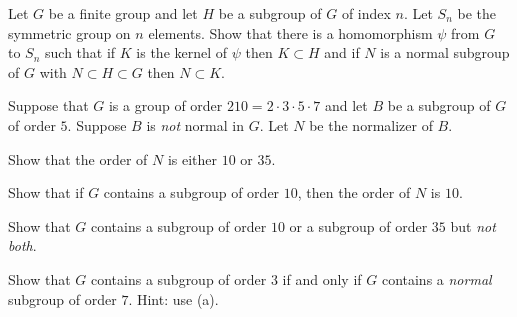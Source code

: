 \begin{alist}
\item Let $G$ be a finite group and let $H$ be a subgroup of $G$ of
index $n$. Let $S_n$ be the symmetric group on $n$ elements. Show that
there is a homomorphism $\psi$ from $G$ to $S_n$ such that if $K$ is
the kernel of $\psi$ then $K\subset H$ and if $N$ is a normal subgroup
of $G$ with $N\subset H\subset G$ then $N\subset K$.
\item Suppose that $G$ is a group of order $210=2\cdot 3\cdot 5\cdot
7$ and let $B$ be a subgroup of $G$ of order $5$. Suppose $B$ is
\emph{not} normal in $G$. Let $N$ be the normalizer of $B$.
\begin{rlist}
\item Show that the order of $N$ is either $10$ or $35$.
\item Show that if $G$ contains a subgroup of order $10$, then the
order of $N$ is $10$.
\item Show that $G$ contains a subgroup of order $10$ or a subgroup of
order $35$ but \emph{not both}.
\item Show that $G$ contains a subgroup of order $3$ if and only if
$G$ contains a \emph{normal} subgroup of order $7$. Hint: use (a). 
\end{rlist}
\end{alist}

